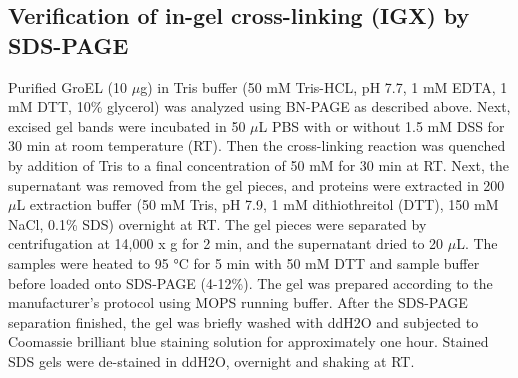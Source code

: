 \subsection*{Verification of in-gel cross-linking (IGX) by SDS-PAGE}
Purified GroEL (10 $\mu$g) in Tris buffer (50 mM Tris-HCL, pH 7.7, 1 mM EDTA, 1 mM DTT, 10\% glycerol) was analyzed using BN-PAGE as described above. Next, excised gel bands were incubated in 50 $\mu$L PBS with or without 1.5 mM DSS for 30 min at room temperature (RT). Then the cross-linking reaction was quenched by addition of Tris to a final concentration of 50 mM for 30 min at RT. Next, the supernatant was removed from the gel pieces, and proteins were extracted in 200 $\mu$L extraction buffer (50 mM Tris, pH 7.9, 1 mM dithiothreitol (DTT), 150 mM NaCl, 0.1\% SDS) overnight at RT. The gel pieces were separated by centrifugation at 14,000 x g for 2 min, and the supernatant dried to 20 $\mu$L. The samples were heated to 95 °C for 5 min with 50 mM DTT and sample buffer before loaded onto SDS-PAGE (4-12\%). The gel was prepared according to the manufacturer's protocol using MOPS running buffer. After the SDS-PAGE separation finished, the gel was briefly washed with ddH2O and subjected to Coomassie brilliant blue staining solution for approximately one hour. Stained SDS gels were de-stained in ddH2O, overnight and shaking at RT.

